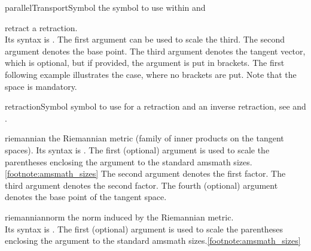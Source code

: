 \documentclass[english,a4paper,DIV=12,parskip=full,oneside]{scrartcl}
\begin{document}
\begin{commandlist}
		\par{}
		\par{}
	\item[parallelTransportSymbol]\hspace*{2em}the symbol to use within \codeCommand{\parallelTransport} and \codeCommand{\parallelTransportDir}
		\par\mathCodeExample{\parallelTransportSymbol}
	\item[retract] a retraction.\\
		Its syntax is .
		The first argument can be used to scale the third.
		The second argument denotes the base point.
		The third argument denotes the tangent vector, which is optional, but
		if provided, the argument is put in brackets. The first following example
		illustrates the case, where no brackets are put. Note that the space is
		mandatory.
		\par{}
		\par{}
		\par{}
	\item[retractionSymbol] symbol to use for a retraction and an inverse retraction,
		see \codeCommand{\retract} and \codeCommand{\inverseRetract}.
		\par\mathCodeExample{\retractionSymbol}
	\item[riemannian] the Riemannian metric (family of inner products on the tangent spaces).
		Its syntax is .
		The first (optional) argument is used to scale the parentheses enclosing the argument to the standard amsmath sizes.\cref{footnote:amsmath_sizes}
		The second argument denotes the first factor.
		The third argument denotes the second factor.
		The fourth (optional) argument denotes the base point of the tangent space.
		\par{}
		\par{}
		\par{}
	\item[riemanniannorm] the norm induced by the Riemannian metric.\\
		Its syntax is .
		The first (optional) argument is used to scale the parentheses enclosing the argument to the standard amsmath sizes.\cref{footnote:amsmath_sizes}

\end{commandlist}
\end{document}
